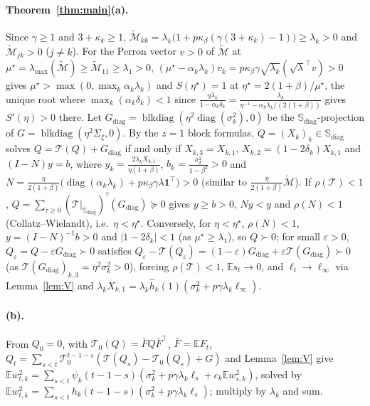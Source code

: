 \documentclass[11pt]{article}
\newcommand{\E}{\mathbb{E}}
\newcommand{\T}{\mathcal T}
\begin{document}
\paragraph{Theorem~\ref{thm:main}(a).} Since $\gamma\ge1$ and $3+\kappa_k\ge1$, $\widetilde{\mathcal M}_{kk}=\lambda_k\big(1+p\kappa_\beta(\gamma(3+\kappa_k)-1)\big)\ge\lambda_k>0$ and $\widetilde{\mathcal M}_{jk}>0$ ($j\ne k$). For the Perron vector $v>0$ of $\widetilde{\mathcal M}$ at $\mu^\star=\lambda_{\max}(\widetilde{\mathcal M})\ge\widetilde{\mathcal M}_{11}\ge\lambda_1>0$, $(\mu^\star-\alpha_k\lambda_k)v_k=p\kappa_\beta\gamma\sqrt{\lambda_k}(\sqrt\lambda^\top v)>0$ gives $\mu^\star>\max(0,\max_k\alpha_k\lambda_k)$ and $S(\eta^\star)=1$ at $\eta^\star=2(1+\beta)/\mu^\star$, the unique root where $\max_k(\alpha_k\delta_k)<1$ since $\frac{\eta\lambda_k}{1-\alpha_k\delta_k}=\frac{\lambda_k}{\eta^{-1}-\alpha_k\lambda_k/(2(1+\beta))}$ gives $S'(\eta)>0$ there. Let $G_{\mathrm{diag}}=\operatorname{blkdiag}(\eta^2\operatorname{diag}(\sigma_k^2),0)$ be the $\mathbb S_{\mathrm{diag}}$-projection of $G=\operatorname{blkdiag}(\eta^2\Sigma_\xi,0)$. By the $z=1$ block formulas, $Q=(X_k)_k\in\mathbb S_{\mathrm{diag}}$ solves $Q=\T(Q)+G_{\mathrm{diag}}$ \citep[cf.][]{liu2021noise} if and only if $X_{k,3}=X_{k,1}$, $X_{k,2}=(1-2\delta_k)X_{k,1}$ and $(I-N)y=b$, where $y_k=\frac{2\lambda_kX_{k,1}}{\eta(1+\beta)}$, $b_k=\frac{\sigma_k^2}{1-\beta^2}>0$ and $N=\frac{\eta}{2(1+\beta)}\big(\operatorname{diag}(\alpha_k\lambda_k)+p\kappa_\beta\gamma\lambda\mathbf 1^\top\big)>0$ (similar to $\frac{\eta}{2(1+\beta)}\widetilde{\mathcal M}$). If $\rho(\T)<1$, $Q=\sum_{\tau\ge0}(\T|_{\mathbb S_{\mathrm{diag}}})^\tau(G_{\mathrm{diag}})\succeq0$ gives $y\ge b>0$, $Ny<y$ and $\rho(N)<1$ (Collatz--Wielandt), i.e.\ $\eta<\eta^\star$. Conversely, for $\eta<\eta^\star$, $\rho(N)<1$, $y=(I-N)^{-1}b>0$ and $|1-2\delta_k|<1$ (as $\mu^\star\ge\lambda_1$), so $Q\succ0$; for small $\varepsilon>0$, $Q_\varepsilon=Q-\varepsilon G_{\mathrm{diag}}\succ0$ satisfies $Q_\varepsilon-\T(Q_\varepsilon)=(1-\varepsilon)G_{\mathrm{diag}}+\varepsilon\T(G_{\mathrm{diag}})\succ0$ (as $\T(G_{\mathrm{diag}})_{k,3}=\eta^2\sigma_k^2>0$), forcing $\rho(\T)<1$, $\E s_t\to0$, and $\ell_t\to\ell_\infty$ via Lemma~\ref{lem:V} and $\lambda_kX_{k,1}=\lambda_k\widehat h_k(1)(\sigma_k^2+p\gamma\lambda_k\ell_\infty)$.

\paragraph{(b).} From $Q_0=0$, with $\T_0(Q)=\bar FQ\bar F^\top$, $\bar F=\E F_t$, $Q_t=\sum_{s<t}\T_0^{t-1-s}(\T(Q_s)-\T_0(Q_s)+G)$ and Lemma~\ref{lem:V} give $\E w_{t,k}^2=\sum_{s<t}\psi_k(t-1-s)(\sigma_k^2+p\gamma\lambda_k\ell_s+c_k\E w_{s,k}^2)$, solved by $\E w_{t,k}^2=\sum_{s<t}h_k(t-1-s)(\sigma_k^2+p\gamma\lambda_k\ell_s)$; multiply by $\lambda_k$ and sum.
\end{document}
